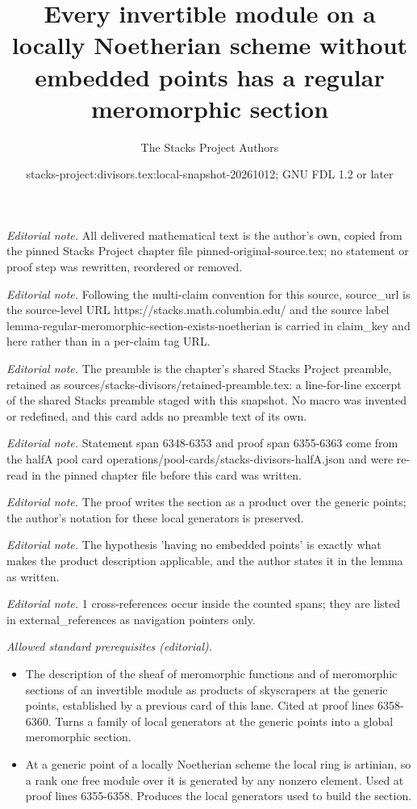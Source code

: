 \documentclass[10pt,a4paper]{amsart}
\title{Every invertible module on a locally Noetherian scheme without embedded points has a regular meromorphic section}
\author{The Stacks Project Authors}
\date{stacks-project:divisors.tex:local-snapshot-20261012; GNU FDL 1.2 or later}
\theoremstyle{plain}
\theoremstyle{definition}
\theoremstyle{remark}
\numberwithin{equation}{subsection}
\begin{document}
\maketitle
\noindent\textit{Editorial note.} All delivered mathematical text is the author's own, copied from the pinned Stacks Project chapter file pinned-original-source.tex; no statement or proof step was rewritten, reordered or removed.\par\medskip
\noindent\textit{Editorial note.} Following the multi-claim convention for this source, source\_url is the source-level URL https://stacks.math.columbia.edu/ and the source label lemma-regular-meromorphic-section-exists-noetherian is carried in claim\_key and here rather than in a per-claim tag URL.\par\medskip
\noindent\textit{Editorial note.} The preamble is the chapter's shared Stacks Project preamble, retained as sources/stacks-divisors/retained-preamble.tex: a line-for-line excerpt of the shared Stacks preamble staged with this snapshot. No macro was invented or redefined, and this card adds no preamble text of its own.\par\medskip
\noindent\textit{Editorial note.} Statement span 6348-6353 and proof span 6355-6363 come from the halfA pool card operations/pool-cards/stacks-divisors-halfA.json and were re-read in the pinned chapter file before this card was written.\par\medskip
\noindent\textit{Editorial note.} The proof writes the section as a product over the generic points; the author's notation for these local generators is preserved.\par\medskip
\noindent\textit{Editorial note.} The hypothesis 'having no embedded points' is exactly what makes the product description applicable, and the author states it in the lemma as written.\par\medskip
\noindent\textit{Editorial note.} 1 cross-references occur inside the counted spans; they are listed in external\_references as navigation pointers only.\par\medskip
\noindent\textit{Allowed standard prerequisites (editorial).}\begin{itemize}
\item The description of the sheaf of meromorphic functions and of meromorphic sections of an invertible module as products of skyscrapers at the generic points, established by a previous card of this lane. Cited at proof lines 6358-6360. Turns a family of local generators at the generic points into a global meromorphic section.
\item At a generic point of a locally Noetherian scheme the local ring is artinian, so a rank one free module over it is generated by any nonzero element. Used at proof lines 6355-6358. Produces the local generators used to build the section.
\end{itemize}\medskip
\end{document}
